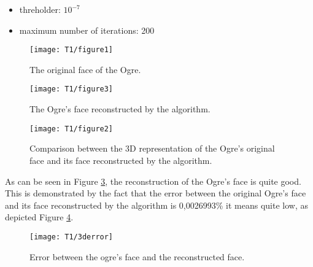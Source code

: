 \begin{itemize}
\item threholder: $10^{-7}$
\item maximum number of iterations: 200
\end{itemize}

\begin{figure}[h!]
    \centering
    \texttt{[image: T1/figure1]}
    \caption{The original face of the Ogre.}
    \label{fig:real_ogre}
\end{figure}

\begin{figure}[h!]
    \centering
    \texttt{[image: T1/figure3]}
    \caption{The Ogre's face reconstructed by the algorithm.}
    \label{fig:ogre}
\end{figure}

\begin{figure}[h!]
    \centering
    \texttt{[image: T1/figure2]}
    \caption{Comparison between the 3D representation of the Ogre's original face and its face reconstructed by the algorithm.}
    \label{fig:real_ogre_vs_ogre}
\end{figure}

\noindent As can be seen in Figure \ref{fig:real_ogre_vs_ogre}, the reconstruction of the Ogre's face is quite good. This is demonstrated by the fact that the error between the original Ogre's face and its face reconstructed by the algorithm is 0,0026993\% it means quite low, as depicted Figure \ref{fig:3d_error}.

\begin{figure}[h!]
    \centering
    \texttt{[image: T1/3derror]}
    \caption{Error between the ogre's face and the reconstructed face.}
    \label{fig:3d_error}
\end{figure}
